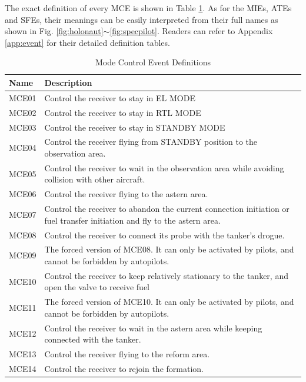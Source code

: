 The exact definition of every MCE is shown in Table \ref{tab:MCE}. As for the MIEs, ATEs and SFEs, their meanings can be easily interpreted from their full names as shown in Fig. \ref{fig:holonaut}$ \sim$\ref{fig:specpilot}. Readers can refer to Appendix \ref{app:event} for their detailed definition tables.

\begin{table}
	\caption{Mode Control Event Definitions \label{tab:MCE}}
	{\begin{tabular}{@{}lp{15cm}@{}}
			\hline \hline
			Name & Description \\
			\hline \hline 
			MCE01 & Control the receiver to stay in EL MODE \\ 
			MCE02 & Control the receiver to stay in RTL MODE \\ 
			MCE03 & Control the receiver to stay in STANDBY MODE \\ 
			MCE04 & Control the receiver flying from STANDBY position to the observation area. \\ 
			MCE05 & Control the receiver to wait in the observation area while avoiding collision with other aircraft. \\ 
			MCE06 & Control the receiver flying to the astern area.\\ 
			MCE07 & Control the receiver to abandon the current connection initiation or fuel transfer initiation and fly to the astern area. \\ 
			MCE08 & Control the receiver to connect its probe with the tanker's drogue. \\ 
			MCE09 & The forced version of MCE08. It  can only be activated by pilots, and cannot be forbidden by autopilots. \\ 
			MCE10 & Control the receiver to keep relatively stationary to the tanker, and open the valve to receive fuel\\ 
			MCE11 & The forced version of MCE10.   It can only be activated by pilots, and cannot be forbidden  by autopilots. \\ 
			MCE12 & Control the receiver to wait in the astern area while keeping connected with the tanker. \\ 
			MCE13 & Control the receiver flying to the reform area.\\ 
			MCE14 & Control the receiver to rejoin the formation. \\
			\hline \hline
	\end{tabular}}
\end{table}	


